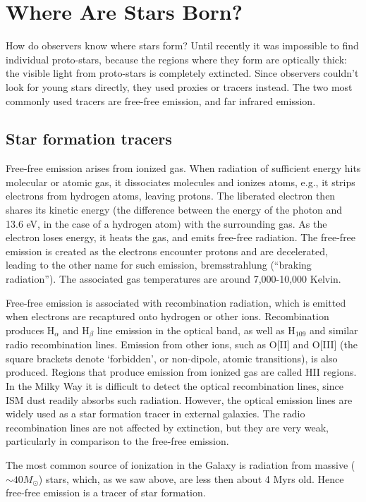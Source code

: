 \documentclass[../dissertation.tex]{subfiles}
\begin{document}
\section{Where Are Stars Born?}
How do observers know where stars form?
Until recently it was impossible to find individual proto-stars, because the regions where they form are optically thick: the visible light from proto-stars is completely extincted. Since observers couldn't look for young stars directly, they used proxies or tracers instead. 
The two most commonly used tracers are free-free emission, and far infrared emission.

\subsection{Star formation tracers}

Free-free emission arises from ionized gas. When radiation of sufficient energy hits molecular or atomic gas, it dissociates molecules and ionizes atoms, e.g.,  it strips electrons from hydrogen atoms, leaving protons.
The liberated electron then shares its kinetic energy (the difference between the energy of the photon and 13.6 eV, in the case of a hydrogen atom) with the surrounding gas. 
As the electron loses energy, it heats the gas, and emits free-free radiation.
The free-free emission is created as the electrons encounter protons and are decelerated, leading to the other name for such emission, bremsstrahlung (``braking radiation''). 
The associated gas temperatures are around 7,000-10,000 Kelvin. 

Free-free emission is associated with recombination radiation, which is emitted when electrons are recaptured onto hydrogen or other ions. Recombination produces
H$_\alpha$ and H$_\beta$ line emission in the optical band, as well as H$_{109}$ and similar radio recombination lines. Emission from other ions, such as O[II] and O[III] (the square brackets denote `forbidden', or non-dipole, atomic transitions), is also produced. Regions that produce emission from ionized gas are called HII regions. In the Milky Way it is difficult to detect the optical recombination lines, since ISM dust readily absorbs such radiation. However, the optical emission lines are widely used as a star formation tracer in external galaxies. The radio recombination lines are not affected by extinction, but they are very weak, particularly in comparison to the free-free emission. 

The most common source of ionization in the Galaxy is radiation from massive ($\sim 40M_\odot$) stars, which, as we saw above, are less then about 4 Myrs old. Hence free-free emission is a tracer of star formation.
\end{document}
